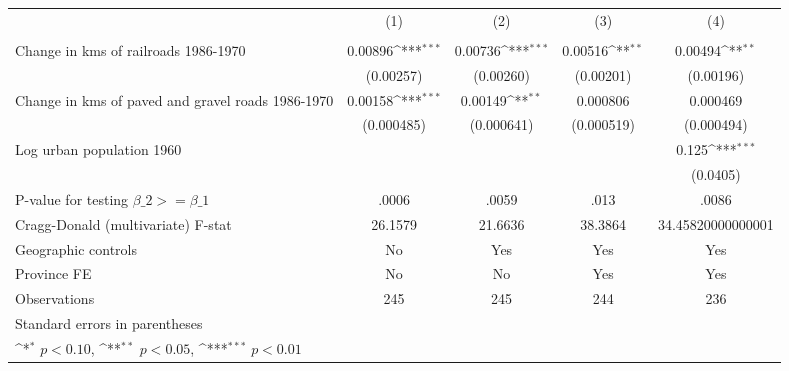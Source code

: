 {
\def\sym#1{\ifmmode^{#1}\else\(^{#1}\)\fi}
\begin{tabular}{l*{4}{c}}
\hline\hline
                &\multicolumn{1}{c}{(1)}&\multicolumn{1}{c}{(2)}&\multicolumn{1}{c}{(3)}&\multicolumn{1}{c}{(4)}\\
                &\multicolumn{1}{c}{}&\multicolumn{1}{c}{}&\multicolumn{1}{c}{}&\multicolumn{1}{c}{}\\
\hline
Change in kms of railroads 1986-1970&  0.00896\sym{***}&  0.00736\sym{***}&  0.00516\sym{**} &  0.00494\sym{**} \\
                &(0.00257)         &(0.00260)         &(0.00201)         &(0.00196)         \\
[1em]
Change in kms of paved and gravel roads 1986-1970&  0.00158\sym{***}&  0.00149\sym{**} & 0.000806         & 0.000469         \\
                &(0.000485)         &(0.000641)         &(0.000519)         &(0.000494)         \\
[1em]
Log urban population 1960&                  &                  &                  &    0.125\sym{***}\\
                &                  &                  &                  & (0.0405)         \\
\hline
P-value for testing $\beta\_{2} >= \beta\_{1}$&    .0006         &    .0059         &     .013         &    .0086         \\
Cragg-Donald (multivariate) F-stat&  26.1579         &  21.6636         &  38.3864         &34.45820000000001         \\
Geographic controls&       No         &      Yes         &      Yes         &      Yes         \\
Province FE     &       No         &       No         &      Yes         &      Yes         \\
Observations    &      245         &      245         &      244         &      236         \\
\hline\hline
\multicolumn{5}{l}{\footnotesize Standard errors in parentheses}\\
\multicolumn{5}{l}{\footnotesize \sym{*} \(p<0.10\), \sym{**} \(p<0.05\), \sym{***} \(p<0.01\)}\\
\end{tabular}
}
